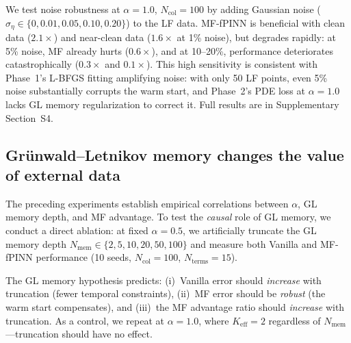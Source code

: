 \documentclass[11pt]{article}
\newcommand{\Ncol}{N_{\mathrm{col}}}
\begin{document}
We test noise robustness at $\alpha = 1.0$, $\Ncol = 100$ by adding Gaussian noise ($\sigma_\eta \in \{0, 0.01, 0.05, 0.10, 0.20\}$) to the LF data. MF-fPINN is beneficial with clean data ($2.1\times$) and near-clean data ($1.6\times$ at 1\% noise), but degrades rapidly: at 5\% noise, MF already hurts ($0.6\times$), and at 10--20\%, performance deteriorates catastrophically ($0.3\times$ and $0.1\times$). This high sensitivity is consistent with Phase~1's L-BFGS fitting amplifying noise: with only 50 LF points, even 5\% noise substantially corrupts the warm start, and Phase~2's PDE loss at $\alpha = 1.0$ lacks GL memory regularization to correct it. Full results are in Supplementary Section~S4.

\subsection{Grünwald--Letnikov memory changes the value of external data}
\label{sec:gl_ablation}

The preceding experiments establish empirical correlations between $\alpha$, GL memory depth, and MF advantage. To test the \emph{causal} role of GL memory, we conduct a direct ablation: at fixed $\alpha = 0.5$, we artificially truncate the GL memory depth $N_{\mathrm{mem}} \in \{2, 5, 10, 20, 50, 100\}$ and measure both Vanilla and MF-fPINN performance (10 seeds, $\Ncol = 100$, $N_{\mathrm{terms}} = 15$).

The GL memory hypothesis predicts: (i)~Vanilla error should \emph{increase} with truncation (fewer temporal constraints), (ii)~MF error should be \emph{robust} (the warm start compensates), and (iii)~the MF advantage ratio should \emph{increase} with truncation. As a control, we repeat at $\alpha = 1.0$, where $K_{\mathrm{eff}} = 2$ regardless of $N_{\mathrm{mem}}$---truncation should have no effect.
\end{document}

